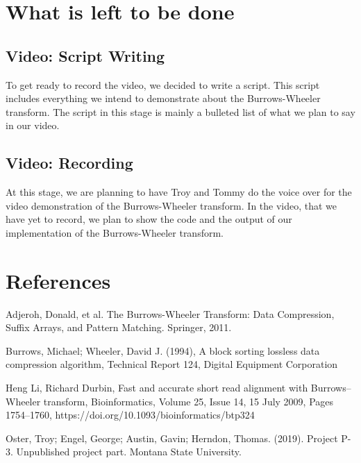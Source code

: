 \documentclass{article}
\begin{document}
   \section{What is left to be done}
   
   \subsection{Video: Script Writing}
   To get ready to record the video, we decided to write a script. This script includes everything we intend to demonstrate about the Burrows-Wheeler transform. The script in this stage is mainly a bulleted list of what we plan to say in our video.
   
   \subsection{Video: Recording}
   At this stage, we are planning to have Troy and Tommy do the voice over for the video demonstration of the Burrows-Wheeler transform. In the video, that we have yet to record, we plan to show the code and the output of our implementation of the Burrows-Wheeler transform.
   
      \section{References}
   \newline \makebox[.5cm]{[1]} Adjeroh, Donald, et al. The Burrows-Wheeler Transform: Data Compression, Suffix Arrays, and Pattern Matching. Springer, 2011.\par
    \makebox[.5cm]{[2]}  Burrows, Michael; Wheeler, David J. (1994), A block sorting lossless data compression algorithm, Technical Report 124, Digital Equipment Corporation\par
    \makebox[.5cm]{[3]} Heng Li, Richard Durbin, Fast and accurate short read alignment with Burrows–Wheeler transform, Bioinformatics, Volume 25, Issue 14, 15 July 2009, Pages 1754–1760, https://doi.org/10.1093/bioinformatics/btp324\par
    \makebox[.5cm]{[4]} Oster, Troy; Engel, George; Austin, Gavin; Herndon, Thomas. (2019). Project P-3. Unpublished project part. Montana State University.\par
\end{document}
